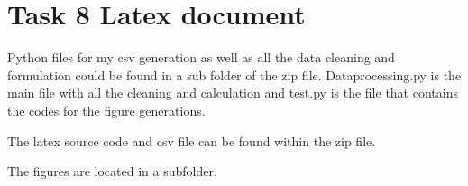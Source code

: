 \documentclass{article}
\begin{document}
\section{Task 8 Latex document}
Python files for my csv generation as well as all the data cleaning and formulation could be found in a sub folder of the zip file. Dataprocessing.py is the main file with all the cleaning and calculation and test.py is the file that contains the codes for the figure generations.

The latex source code and csv file can be found within the zip file.

The figures are located in a subfolder.
\end{document}
